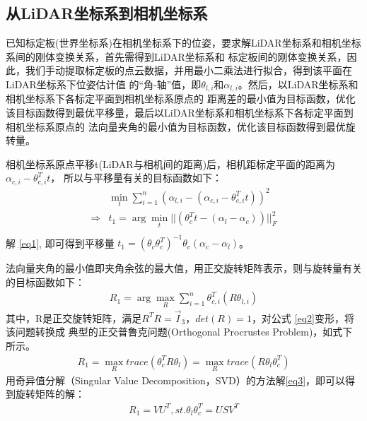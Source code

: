 \subsection{从LiDAR坐标系到相机坐标系}
已知标定板(世界坐标系)在相机坐标系下的位姿，要求解LiDAR坐标系和相机坐标系间的刚体变换关系，首先需得到LiDAR坐标系和
标定板间的刚体变换关系，因此，我们手动提取标定板的点云数据，并用最小二乘法进行拟合，得到该平面在LiDAR坐标系下位姿估计值
的“角-轴”值，即$\theta_{l,i}$和$\alpha_{l,i}$。然后，以LiDAR坐标系和相机坐标系下各标定平面到相机坐标系原点的
距离差的最小值为目标函数，优化该目标函数得到最优平移量，最后以LiDAR坐标系和相机坐标系下各标定平面到相机坐标系原点的
法向量夹角的最小值为目标函数，优化该目标函数得到最优旋转量。

相机坐标系原点平移t(LiDAR与相机间的距离)后，相机距标定平面的距离为$\alpha_{c,i}-\theta_{c,i}^{T}t$，
所以与平移量有关的目标函数如下：
\begin{equation}\label{eq1}
\begin{aligned}
& \min \limits_{t} \sum_{i=1}^{n}(\alpha_{l,i}-(\alpha_{c,i}-\theta_{c,i}^{T}t))^{2} \\
\Longrightarrow & t_{1}=\arg \min \limits_{t} || (\theta_{c}^{T}t-(\alpha_{l}-\alpha_{c}))||^{2}_{F} \\
\end{aligned}
\end{equation}
解 \eqref{eq1}, 即可得到平移量
$t_{1}=(\theta_{c}\theta_{c}^{T})^{-1}\theta_{c}(\alpha_{c}-\alpha_{l})$。

法向量夹角的最小值即夹角余弦的最大值，用正交旋转矩阵表示，则与旋转量有关的目标函数如下：
\begin{equation}\label{eq2}
\begin{aligned}
R_{1}=\arg \max \limits_{R} \sum_{i=1}^{n} \theta_{c,i}^{T} (R \theta_{l,i})
\end{aligned}
\end{equation}
其中，R是正交旋转矩阵，满足$R^{T}R=\vec{I}_{3}$，$det(R)=1$，对公式 \eqref{eq2}变形，将该问题转换成
典型的正交普鲁克问题(Orthogonal Procrustes Problem)，如式下所示。
\begin{equation}\label{eq3}
\begin{aligned}
R_{1}=\max \limits_{R} trace(\theta_{c}^{T}R\theta_{l})
=\max \limits_{R} trace(R\theta_{l}\theta_{c}^{T})
\end{aligned}
\end{equation}
用奇异值分解（Singular Value Decomposition，SVD）的方法解\eqref{eq3}，即可以得到旋转矩阵的解：
\begin{equation}
\begin{aligned}
R_{1}= VU^{T},  st.\theta_{l}\theta_{c}^{T}=USV^{T}
\end{aligned}
\end{equation}

